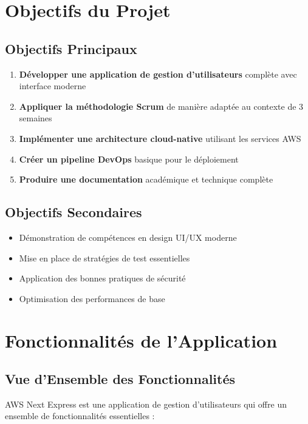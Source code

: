 \section{Objectifs du Projet}

\subsection{Objectifs Principaux}

\begin{enumerate}
    \item \textbf{Développer une application de gestion d'utilisateurs} complète avec interface moderne
    \item \textbf{Appliquer la méthodologie Scrum} de manière adaptée au contexte de 3 semaines
    \item \textbf{Implémenter une architecture cloud-native} utilisant les services AWS
    \item \textbf{Créer un pipeline DevOps} basique pour le déploiement
    \item \textbf{Produire une documentation} académique et technique complète
\end{enumerate}

\subsection{Objectifs Secondaires}

\begin{itemize}
    \item Démonstration de compétences en design UI/UX moderne
    \item Mise en place de stratégies de test essentielles
    \item Application des bonnes pratiques de sécurité
    \item Optimisation des performances de base
\end{itemize}

\section{Fonctionnalités de l'Application}

\subsection{Vue d'Ensemble des Fonctionnalités}

AWS Next Express est une application de gestion d'utilisateurs qui offre un ensemble de fonctionnalités essentielles :


